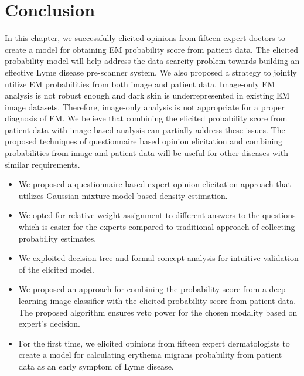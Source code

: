 	\section{Conclusion}\label{sec:elicitation_conclusion}
	In this chapter, we successfully elicited opinions from fifteen expert doctors to create a model for obtaining EM probability score from patient data. The elicited probability model will help address the data scarcity problem towards building an effective Lyme disease pre-scanner system. We also proposed a strategy to jointly utilize EM probabilities from both image and patient data. Image-only EM analysis is not robust enough and dark skin is underrepresented in existing EM image datasets. Therefore, image-only analysis is not appropriate for a proper diagnosis of EM. We believe that combining the elicited probability score from patient data with image-based analysis can partially address these issues. The proposed techniques of questionnaire based opinion elicitation and combining probabilities from image and patient data will be useful for other diseases with similar requirements.
	
	\begin{tcolorbox}[enhanced,attach boxed title to top center={yshift=-3mm,yshifttext=-1mm},
		coltitle=black, colback=blue!5!white,colframe=blue!75!black,colbacktitle=violet!50!white,
		title=Key Points (Chapter \ref{chap:Elicitation}),fonttitle=\bfseries,
		boxed title style={colframe=black}, breakable]
		\begin{itemize}
			\item We proposed a questionnaire based expert opinion elicitation approach that utilizes Gaussian mixture model based density estimation.
			\item We opted for relative weight assignment to different answers to the questions which is easier for the experts compared to traditional approach of collecting probability estimates.
			\item We exploited decision tree and formal concept analysis for intuitive validation of the elicited model.
			\item We proposed an approach for combining the probability score from a deep learning image classifier with the elicited probability score from patient data. The proposed algorithm ensures veto power for the chosen modality based on expert's decision.
			\item For the first time, we elicited opinions from fifteen expert dermatologists to create a model for calculating erythema migrans probability from patient data as an early symptom of Lyme disease.
		\end{itemize}
	\end{tcolorbox}
